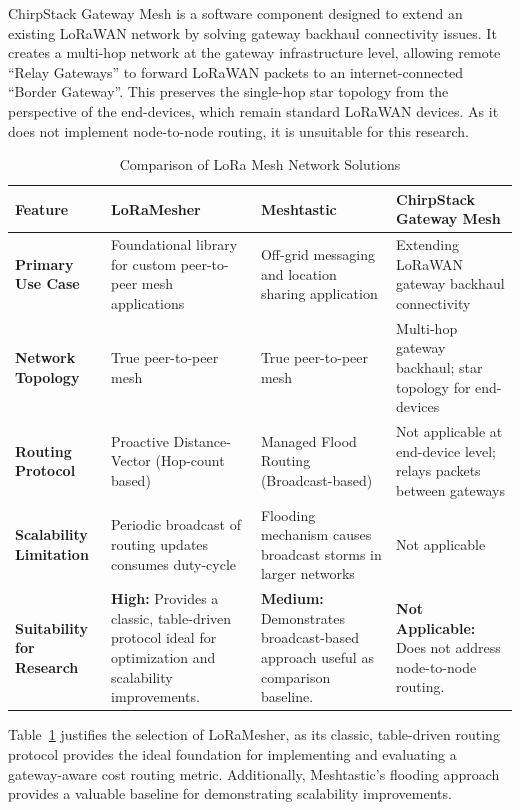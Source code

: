 ChirpStack Gateway Mesh is a software component designed to extend an existing LoRaWAN network by solving gateway backhaul connectivity issues. It creates a multi-hop network at the gateway infrastructure level, allowing remote ``Relay Gateways'' to forward LoRaWAN packets to an internet-connected ``Border Gateway''. This preserves the single-hop star topology from the perspective of the end-devices, which remain standard LoRaWAN devices. As it does not implement node-to-node routing, it is unsuitable for this research.

\begin{table}[H]
\centering
\caption{Comparison of LoRa Mesh Network Solutions}
\label{tab:lora_mesh_comparison}
\begin{tabular}{p{3cm}p{3.5cm}p{3.5cm}p{3.5cm}}
\hline
\textbf{Feature} & \textbf{LoRaMesher} & \textbf{Meshtastic} & \textbf{ChirpStack Gateway Mesh} \\
\hline
\textbf{Primary Use Case} & Foundational library for custom peer-to-peer mesh applications & Off-grid messaging and location sharing application & Extending LoRaWAN gateway backhaul connectivity \\
\hline
\textbf{Network Topology} & True peer-to-peer mesh & True peer-to-peer mesh & Multi-hop gateway backhaul; star topology for end-devices \\
\hline
\textbf{Routing Protocol} & Proactive Distance-Vector (Hop-count based) & Managed Flood Routing (Broadcast-based) & Not applicable at end-device level; relays packets between gateways \\
\hline
\textbf{Scalability Limitation} & Periodic broadcast of routing updates consumes duty-cycle & Flooding mechanism causes broadcast storms in larger networks & Not applicable \\
\hline
\textbf{Suitability for Research} & \textbf{High:} Provides a classic, table-driven protocol ideal for optimization and scalability improvements. & \textbf{Medium:} Demonstrates broadcast-based approach useful as comparison baseline. & \textbf{Not Applicable:} Does not address node-to-node routing. \\
\hline
\end{tabular}
\end{table}

Table~\ref{tab:lora_mesh_comparison} justifies the selection of LoRaMesher, as its classic, table-driven routing protocol provides the ideal foundation for implementing and evaluating a gateway-aware cost routing metric. Additionally, Meshtastic's flooding approach provides a valuable baseline for demonstrating scalability improvements.

